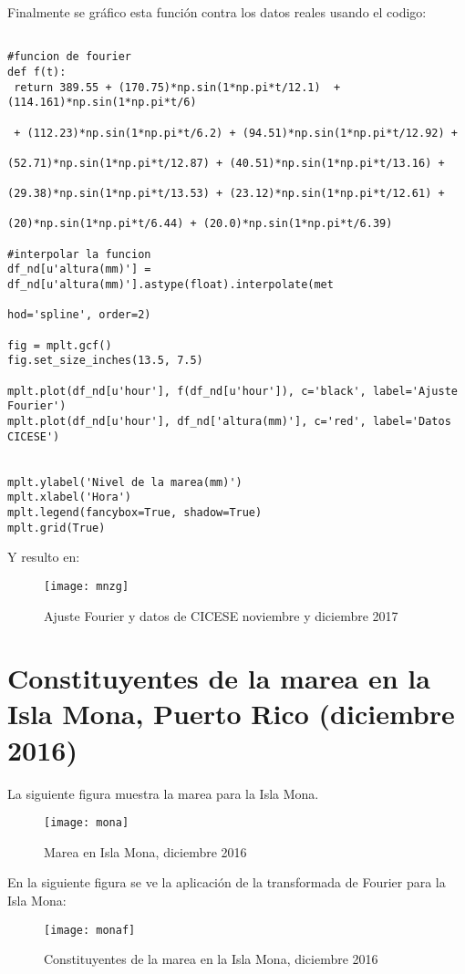 \documentclass[12pt,letterpaper]{article}
\begin{document}
Finalmente se gráfico esta función contra los datos reales usando el codigo:

\begin{verbatim}

#funcion de fourier
def f(t):
 return 389.55 + (170.75)*np.sin(1*np.pi*t/12.1)  + (114.161)*np.sin(1*np.pi*t/6) 
 
 + (112.23)*np.sin(1*np.pi*t/6.2) + (94.51)*np.sin(1*np.pi*t/12.92) +
 
(52.71)*np.sin(1*np.pi*t/12.87) + (40.51)*np.sin(1*np.pi*t/13.16) +

(29.38)*np.sin(1*np.pi*t/13.53) + (23.12)*np.sin(1*np.pi*t/12.61) +

(20)*np.sin(1*np.pi*t/6.44) + (20.0)*np.sin(1*np.pi*t/6.39)    

#interpolar la funcion
df_nd[u'altura(mm)'] = df_nd[u'altura(mm)'].astype(float).interpolate(met

hod='spline', order=2)

fig = mplt.gcf()
fig.set_size_inches(13.5, 7.5)

mplt.plot(df_nd[u'hour'], f(df_nd[u'hour']), c='black', label='Ajuste Fourier')
mplt.plot(df_nd[u'hour'], df_nd['altura(mm)'], c='red', label='Datos CICESE')


mplt.ylabel('Nivel de la marea(mm)')
mplt.xlabel('Hora')
mplt.legend(fancybox=True, shadow=True)
mplt.grid(True)
\end{verbatim}

Y resulto en:

\begin{figure}[H]
	\centering	\texttt{[image: mnzg]}
	\caption{Ajuste Fourier y datos de CICESE noviembre y diciembre 2017}
\end{figure}


\section{Constituyentes de la marea en la Isla Mona, Puerto Rico (diciembre 2016)}

La siguiente figura muestra la marea para la Isla Mona.
\begin{figure}[H]
	\centering	\texttt{[image: mona]}
	\caption{Marea en Isla Mona, diciembre 2016}
\end{figure}

En la siguiente figura se ve la aplicación de la transformada de Fourier para la Isla Mona:

\begin{figure}[H]
	\centering	\texttt{[image: monaf]}
	\caption{Constituyentes de la marea en la Isla Mona, diciembre 2016}
\end{figure}
\end{document}
